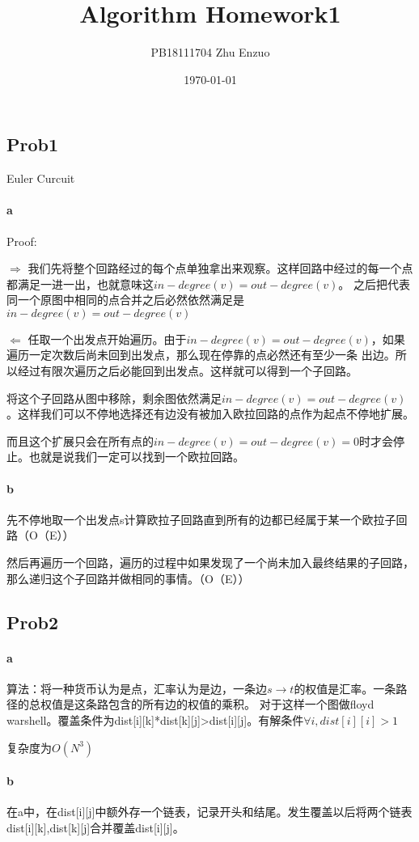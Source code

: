 \documentclass{ctexart}
\title{Algorithm Homework1}
\author{PB18111704 Zhu Enzuo}
\date{\today}
\begin{document}
\maketitle
\subsection{Prob1} Euler Curcuit

\paragraph{a} Proof:

$\Rightarrow$ 我们先将整个回路经过的每个点单独拿出来观察。这样回路中经过的每一个点都满足一进一出，也就意味这$in-degree(v)=out-degree(v)$。
之后把代表同一个原图中相同的点合并之后必然依然满足是$in-degree(v)=out-degree(v)$

$\Leftarrow$ 任取一个出发点开始遍历。由于$in-degree(v)=out-degree(v)$，如果遍历一定次数后尚未回到出发点，那么现在停靠的点必然还有至少一条
出边。所以经过有限次遍历之后必能回到出发点。这样就可以得到一个子回路。

将这个子回路从图中移除，剩余图依然满足$in-degree(v)=out-degree(v)$。这样我们可以不停地选择还有边没有被加入欧拉回路的点作为起点不停地扩展。

而且这个扩展只会在所有点的$in-degree(v)=out-degree(v)=0$时才会停止。也就是说我们一定可以找到一个欧拉回路。

\paragraph{b} 先不停地取一个出发点s计算欧拉子回路直到所有的边都已经属于某一个欧拉子回路（O（E））

然后再遍历一个回路，遍历的过程中如果发现了一个尚未加入最终结果的子回路，那么递归这个子回路并做相同的事情。（O（E））

\subsection{Prob2}
\paragraph{a}
算法：将一种货币认为是点，汇率认为是边，一条边$s \to t$的权值是汇率。一条路径的总权值是这条路包含的所有边的权值的乘积。
对于这样一个图做floyd warshell。覆盖条件为dist[i][k]*dist[k][j]>dist[i][j]。有解条件$\forall i, dist[i][i]>1$

复杂度为$O(N^3)$
\paragraph{b}
在a中，在dist[i][j]中额外存一个链表，记录开头和结尾。发生覆盖以后将两个链表dist[i][k],dist[k][j]合并覆盖dist[i][j]。
\end{document}
